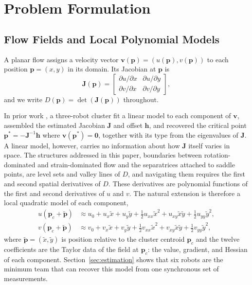 \documentclass[lettersize,journal]{IEEEtran}
\begin{document}
\section{Problem Formulation}
\label{sec:detj_field}

\subsection{Flow Fields and Local Polynomial Models}

A planar flow assigns a velocity vector $\mathbf{v}(\mathbf{p}) =
(u(\mathbf{p}), v(\mathbf{p}))$ to each position $\mathbf{p} = (x, y)$ in its
domain. Its Jacobian at $\mathbf{p}$ is
\begin{equation}
    \mathbf{J}(\mathbf{p}) =
    \begin{bmatrix}
        \partial u / \partial x & \partial u / \partial y \\
        \partial v / \partial x & \partial v / \partial y
    \end{bmatrix},
    \label{eq:jacobian}
\end{equation}
and we write $D(\mathbf{p}) = \det(\mathbf{J}(\mathbf{p}))$ throughout.

In prior work \cite{14}, a three-robot cluster fit a linear model to each
component of $\mathbf{v}$, assembled the estimated Jacobian
$\mathbf{J}$ and offset $\mathbf{h}$, and recovered the critical point
$\mathbf{p}^* = -\mathbf{J}^{-1}\mathbf{h}$ where $\mathbf{v}(\mathbf{p}^*) =
\mathbf{0}$, together with its type from the eigenvalues of $\mathbf{J}$.
A linear model, however, carries no information about how $\mathbf{J}$
itself varies in space. The structures addressed in this paper, boundaries
between rotation-dominated and strain-dominated flow and the separatrices
attached to saddle points, are level sets and valley lines of $D$, and
navigating them requires the first and second spatial derivatives of $D$.
These derivatives are polynomial functions of the first and second
derivatives of $u$ and $v$. The natural extension is therefore a local
quadratic model of each component,
\begin{align}
    u(\mathbf{p}_c + \tilde{\mathbf{p}}) &\approx u_0 + u_x \tilde{x}
        + u_y \tilde{y} + \tfrac{1}{2} u_{xx} \tilde{x}^2
        + u_{xy} \tilde{x}\tilde{y} + \tfrac{1}{2} u_{yy} \tilde{y}^2,
        \label{eq:quad_model_u} \\
    v(\mathbf{p}_c + \tilde{\mathbf{p}}) &\approx v_0 + v_x \tilde{x}
        + v_y \tilde{y} + \tfrac{1}{2} v_{xx} \tilde{x}^2
        + v_{xy} \tilde{x}\tilde{y} + \tfrac{1}{2} v_{yy} \tilde{y}^2,
        \label{eq:quad_model_v}
\end{align}
where $\tilde{\mathbf{p}} = (\tilde{x}, \tilde{y})$ is position relative to
the cluster centroid $\mathbf{p}_c$ and the twelve coefficients are the
Taylor data of the field at $\mathbf{p}_c$: the value, gradient, and
Hessian of each component. Section~\ref{sec:estimation} shows that six
robots are the minimum team that can recover this model from one
synchronous set of measurements.
\end{document}
